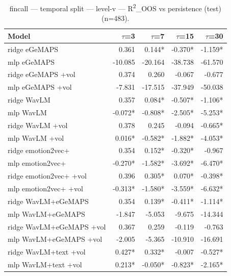 
\begin{table}[t]
\centering
\begin{tabular}{lrrrr}
\toprule
Model & $\tau$=3 & $\tau$=7 & $\tau$=15 & $\tau$=30 \\
\midrule
ridge eGeMAPS & 0.361 & 0.144* & -0.370* & -1.159* \\
mlp eGeMAPS & -10.085 & -20.164 & -38.738 & -61.570 \\
ridge eGeMAPS +vol & 0.374 & 0.260 & -0.067 & -0.677 \\
mlp eGeMAPS +vol & -7.831 & -17.515 & -37.949 & -50.038 \\
ridge WavLM & 0.357 & 0.084* & -0.507* & -1.106* \\
mlp WavLM & -0.072* & -0.808* & -2.505* & -5.253* \\
ridge WavLM +vol & 0.378 & 0.245 & -0.094 & -0.665* \\
mlp WavLM +vol & 0.016* & -0.582* & -1.882* & -4.053* \\
ridge emotion2vec+ & 0.354 & 0.152* & -0.320* & -0.967 \\
mlp emotion2vec+ & -0.270* & -1.582* & -3.692* & -6.470* \\
ridge emotion2vec+ +vol & 0.396 & 0.305* & 0.070* & -0.398* \\
mlp emotion2vec+ +vol & -0.313* & -1.580* & -3.559* & -6.632* \\
ridge WavLM+eGeMAPS & 0.354 & 0.139* & -0.411* & -1.114* \\
mlp WavLM+eGeMAPS & -1.847 & -5.053 & -9.675 & -14.344 \\
ridge WavLM+eGeMAPS +vol & 0.367 & 0.259 & -0.119 & -0.763 \\
mlp WavLM+eGeMAPS +vol & -2.005 & -5.365 & -10.910 & -16.691 \\
ridge WavLM+text +vol & 0.427* & 0.332* & -0.007 & -0.527* \\
mlp WavLM+text +vol & 0.213* & -0.050* & -0.823* & -2.165* \\
\bottomrule
\end{tabular}
\caption{fincall — temporal split — level-v — R\textsuperscript{2}\_OOS vs persistence (test) (n=483).}
\end{table}

